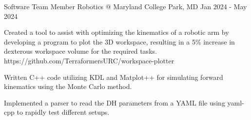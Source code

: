 \begin{work}
{Software Team Member}
{Robotics @ Maryland}
{College Park, MD}
{Jan 2024 - May 2024}

\item {} {Created a tool to assist with optimizing the
      kinematics of a robotic arm by developing a program to plot the 3D workspace, resulting in a
      5\% increase in dexterous workspace volume for the required tasks.}
      {https://github.com/TerraformersURC/workspace-plotter}

      \begin{workdetail-list}

      \item Written C++ code utilizing KDL and Matplot++ for simulating forward kinematics using the
            Monte Carlo method.

      \item Implemented a parser to read the DH parameters from a YAML file using yaml-cpp to
            rapidly test different setups.

      \end{workdetail-list}



\end{work}




